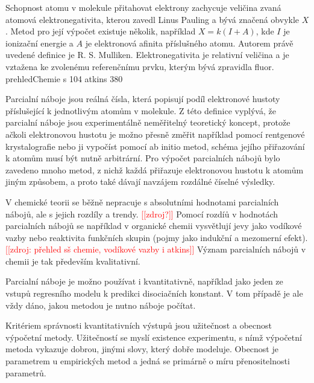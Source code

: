 \documentclass[10pt,draft,oneside]{fithesis2}
\newcommand\fixme[1]{\textcolor{red}{[[#1]]}}
\begin{document}
Schopnost atomu v molekule přitahovat elektrony zachycuje veličina zvaná atomová elektronegativita, kterou zavedl Linus Pauling a bývá značená obvykle $X$. Metod pro její výpočet existuje několik, například $X = k(I+A)$, kde $I$ je ionizační energie a $A$ je elektronová afinita příslušného atomu. Autorem právě uvedené definice je R. S. Mulliken. Elektronegativita je relativní veličina a je vztažena ke zvolenému referenčnímu prvku, kterým bývá zpravidla fluor. prehledChemie s 104 atkins 380

Parcialní náboje jsou reálná čísla, která popisují podíl elektronové hustoty příslušející k jednotlivým atomům v molekule. Z této definice vyplývá, že parcialní náboje jsou experimentálně neměřitelný teoretický koncept, protože ačkoli elektronovou hustotu je možno přesně změřit například pomocí rentgenové krystalografie nebo ji vypočíst pomocí ab initio metod, schéma jejího přiřazování k atomům musí být nutně arbitrární. Pro výpočet parcialních nábojů bylo zavedeno mnoho metod, z nichž každá přiřazuje elektronovou hustotu k atomům jiným způsobem, a proto také dávají navzájem rozdálné číselné výsledky.

V chemické teorii se běžně nepracuje s absolutními hodnotami parcialních nábojů, ale s jejich rozdíly a trendy. \fixme{zdroj?} Pomocí rozdíů v hodnotách parcialních nábojů se například v organické chemii vysvětlují jevy jako vodíkové vazby nebo reaktivita funkčních skupin (pojmy jako indukční a mezomerní efekt). \fixme{zdroj: přehled sš chemie, vodíkové vazby i atkins} Význam parcialních nábojů v chemii je tak především kvalitativní.

Parcialní náboje je možno používat i kvantitativně, například jako jeden ze vstupů regresního modelu k predikci disociačních konstant. V tom případě je ale vždy dáno, jakou metodou je nutno náboje počítat.




Kritériem správnosti kvantitativních výstupů jsou užitečnost a obecnost výpočetní metody. Užitečností se myslí existence experimentu, s nímž výpočetní metoda vykazuje dobrou, jinými slovy, který dobře modeluje. Obecnost je parametrem u empirických metod a jedná se primárně o míru přenositelnosti parametrů.
\end{document}
